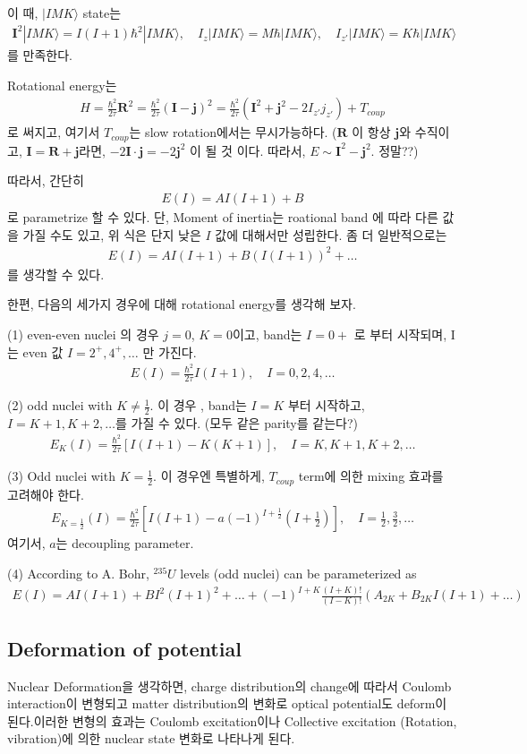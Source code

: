 \documentclass[11pt]{book}
\def\bm{\boldsymbol}
\def\ra{\rangle}
\newcommand{\bea}{\begin{eqnarray}}
\newcommand{\eea}{\end{eqnarray}}
\begin{document}
이 때, $|IMK\ra$ state는
\bea 
{\bm I}^2|IMK\ra =I(I+1)\hbar^2|IMK\ra,
\quad I_{z}|IMK\ra =M\hbar|IMK\ra,\quad 
I_{z'}|IMK\ra =K\hbar|IMK\ra
\eea 
를 만족한다.

Rotational energy는 
\bea 
H=\frac{\hbar^2}{2\tau} {\bm R}^2=\frac{\hbar^2}{2\tau} ({\bm I}-{\bm j})^2
 = \frac{\hbar^2}{2\tau}({\bm I}^2+{\bm j}^2-2 I_{z'}j_{z'})+T_{coup} 
\eea 
로 써지고, 여기서 $T_{coup}$는 slow rotation에서는 무시가능하다. 
(${\bm R}$ 이 항상 ${\bm j}$와 수직이고, ${\bm I}={\bm R}+{\bm j}$라면, 
$-2{\bm I}\cdot{\bm j}=-2{\bm j}^2$ 이 될 것 이다. 따라서, $E\sim {\bm I}^2 -{\bm j}^2$. 정말??)


따라서, 간단히
\bea 
E(I)=A I (I+1)+B
\eea 
로 parametrize 할 수 있다. 
단, Moment of inertia는 roational band 에 따라 다른 값을 가질 수도 있고, 
위 식은 단지 낮은 $I$ 값에 대해서만 성립한다. 좀 더 일반적으로는 
\bea 
E(I)=A I(I+1)+B(I(I+1))^2+\dots 
\eea 
를 생각할 수 있다. 

한편, 다음의 세가지 경우에 대해 rotational energy를 생각해 보자. 

(1) even-even nuclei 의 경우 $j=0$, $K=0$이고, band는 $I=0+$ 로 부터 시작되며,
    I는 even 값 $I=2^{+},4^{+},\dots$ 만 가진다. 
    \bea 
    E(I)=\frac{\hbar^2}{2\tau}I(I+1), \quad I=0,2,4,\dots 
    \eea 

(2) odd nuclei with $K\neq \frac{1}{2}$. 이 경우 , band는 $I=K$ 부터 시작하고,
    $I=K+1,K+2,\dots$를 가질 수 있다. (모두 같은 parity를 같는다?)
    \bea 
    E_K(I)=\frac{\hbar^2}{2\tau}[I(I+1)-K(K+1)], \quad I=K,K+1,K+2,\dots 
    \eea 

(3) Odd nuclei with $K=\frac{1}{2}$. 이 경우엔 특별하게, $T_{coup}$ term에 의한 
   mixing 효과를 고려해야 한다. 
   \bea 
   E_{K=\frac{1}{2}}(I)=\frac{\hbar^2}{2\tau}[I(I+1)-a(-1)^{I+\frac{1}{2}}(I+\frac{1}{2})], \quad I=\frac{1}{2},\frac{3}{2},\dots 
   \eea 
   여기서, $a$는 decoupling parameter.

(4) According to A. Bohr, $^{235}U$ levels (odd nuclei) can be parameterized as
\bea 
E(I) = A I(I+1)+ B I^2(I+1)^2+\dots+(-1)^{I+K}\frac{(I+K)!}{(I-K)!}( A_{2K}+B_{2K} I(I+1)+\dots)
\eea 

\subsection{Deformation of potential}
Nuclear Deformation을 생각하면, charge distribution의 change에 따라서
Coulomb interaction이 변형되고 matter distribution의 변화로 
optical potential도 deform이 된다.이러한 변형의 효과는 Coulomb excitation이나 
Collective excitation (Rotation, vibration)에 의한 
nuclear state 변화로 나타나게 된다. 
\end{document}

